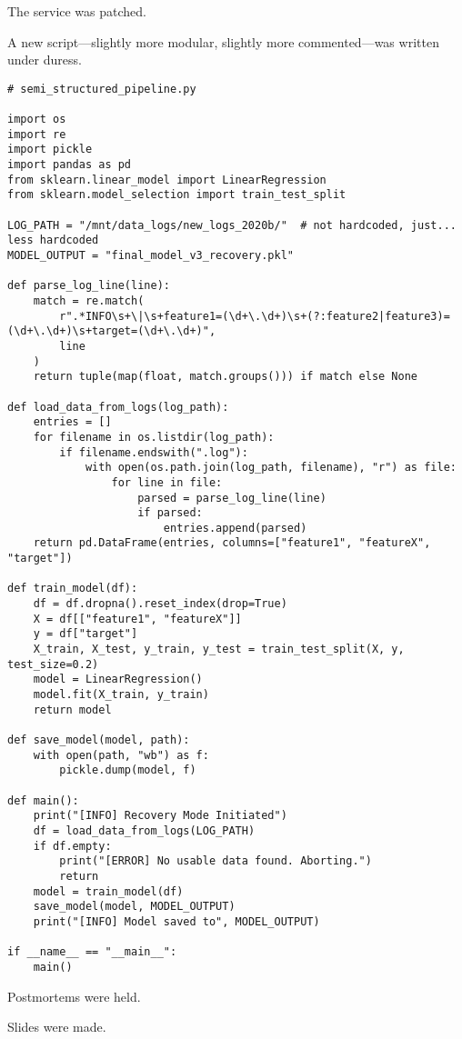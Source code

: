 The service was patched.

A new script---slightly more modular, slightly more commented---was written under duress.

\begin{lstlisting}[caption={The patched script, written under duress}, label={lst:patchscript}, basicstyle=\ttfamily\small, frame=single]
# semi_structured_pipeline.py

import os
import re
import pickle
import pandas as pd
from sklearn.linear_model import LinearRegression
from sklearn.model_selection import train_test_split

LOG_PATH = "/mnt/data_logs/new_logs_2020b/"  # not hardcoded, just... less hardcoded
MODEL_OUTPUT = "final_model_v3_recovery.pkl"

def parse_log_line(line):
    match = re.match(
        r".*INFO\s+\|\s+feature1=(\d+\.\d+)\s+(?:feature2|feature3)=(\d+\.\d+)\s+target=(\d+\.\d+)",
        line
    )
    return tuple(map(float, match.groups())) if match else None

def load_data_from_logs(log_path):
    entries = []
    for filename in os.listdir(log_path):
        if filename.endswith(".log"):
            with open(os.path.join(log_path, filename), "r") as file:
                for line in file:
                    parsed = parse_log_line(line)
                    if parsed:
                        entries.append(parsed)
    return pd.DataFrame(entries, columns=["feature1", "featureX", "target"])

def train_model(df):
    df = df.dropna().reset_index(drop=True)
    X = df[["feature1", "featureX"]]
    y = df["target"]
    X_train, X_test, y_train, y_test = train_test_split(X, y, test_size=0.2)
    model = LinearRegression()
    model.fit(X_train, y_train)
    return model

def save_model(model, path):
    with open(path, "wb") as f:
        pickle.dump(model, f)

def main():
    print("[INFO] Recovery Mode Initiated")
    df = load_data_from_logs(LOG_PATH)
    if df.empty:
        print("[ERROR] No usable data found. Aborting.")
        return
    model = train_model(df)
    save_model(model, MODEL_OUTPUT)
    print("[INFO] Model saved to", MODEL_OUTPUT)

if __name__ == "__main__":
    main()
\end{lstlisting}


Postmortems were held.

Slides were made.

